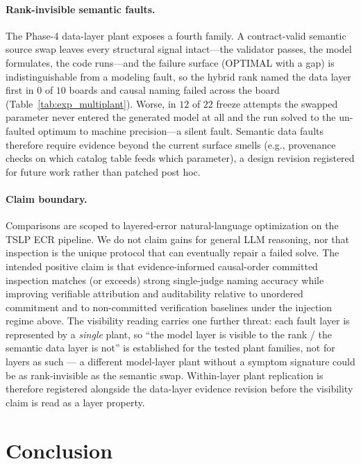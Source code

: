 \documentclass[a4paper,fleqn]{cas-sc}
\begin{document}
\paragraph{Rank-invisible semantic faults.}
The Phase-4 data-layer plant exposes a fourth family. A contract-valid
semantic source swap leaves every structural signal intact---the validator
passes, the model formulates, the code runs---and the failure surface
(OPTIMAL with a gap) is indistinguishable from a modeling fault, so the
hybrid rank named the data layer first in $0$ of $10$ boards and causal
naming failed across the board (Table~\ref{tab:exp_multiplant}). Worse,
in $12$ of $22$ freeze attempts the swapped parameter never entered the
generated model at all and the run solved to the un-faulted optimum to
machine precision---a silent fault. Semantic data faults therefore
require evidence beyond the current surface smells (e.g., provenance
checks on which catalog table feeds which parameter), a design revision
registered for future work rather than patched post hoc.

\paragraph{Claim boundary.}
Comparisons are scoped to layered-error natural-language optimization on the
TSLP ECR pipeline. We do not claim gains for general LLM reasoning, nor that
inspection is the unique protocol that can eventually repair a failed solve.
The intended positive claim is that evidence-informed causal-order committed
inspection matches (or exceeds) strong single-judge naming accuracy while
improving verifiable attribution and auditability relative to unordered
commitment and to non-committed verification baselines under the injection
regime above. The visibility reading carries one further threat: each fault
layer is represented by a \emph{single} plant, so ``the model layer is
visible to the rank / the semantic data layer is not'' is established for
the tested plant families, not for layers as such --- a different model-layer
plant without a symptom signature could be as rank-invisible as the
semantic swap. Within-layer plant replication is therefore registered
alongside the data-layer evidence revision before the visibility claim is
read as a layer property.

\section{Conclusion}
\label{sec:conclusion}
\end{document}
